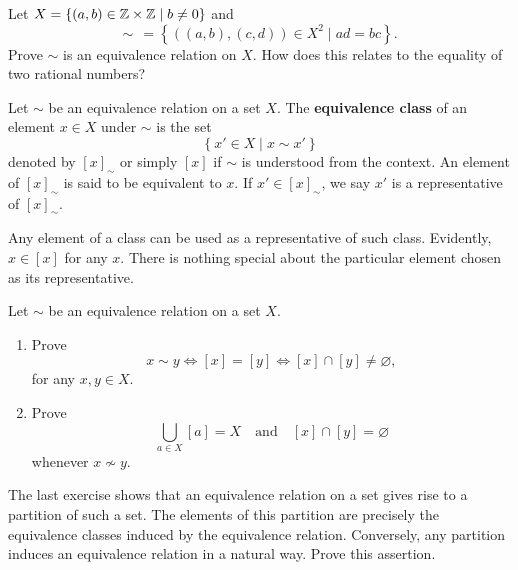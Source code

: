 \documentclass[11pt,a4paper]{article}
\begin{document}
\begin{eje}\label{ej:eqv.rel.on.z2.gives.q}
    Let \(X = \left\{ (a,b  )\in \mathbb{Z}\times \mathbb{Z}     \mid b\neq 0 \right\}\)
    and  \[\sim\;\, = \left\{ ((a,b), (c,d)) \in X^2 \mid ad=bc \right\}.\]
    Prove \(\sim\) is an equivalence relation on \(X\). How does this relates to the equality of two rational numbers?
\end{eje}

\begin{defi}
    Let \(\sim\) be an equivalence relation on a set \(X\).
    The \textbf{equivalence class} of an element \(x\in X\)   under \(\sim\) is the set 
    \[ \left\{ x' \in X \mid x\sim x' \right\}\]
    denoted by \([x]_\sim \) or simply \([x]\) if \(\sim\) is understood from the context.
    An element of \([x]_\sim\) is said to be equivalent to \(x\). 
    If \(x' \in [x]_\sim\), we say \(x'\) is a representative of \([x]_\sim\).
\end{defi}

Any  element of a class
can be used as a representative of such class.
Evidently, \(x\in [x]\) for any \(x\).
There is nothing special about the particular
element chosen as its representative.

\begin{eje}
    Let \(\sim\) be an equivalence relation on a set \(X\).
    \begin{enumerate}[label=(\roman*)]
        \item Prove \[x\sim y \iff [x] = [y] \iff [x]\cap [y] \neq \varnothing,\]
    for any \(x,y\in X\).
        
        \item Prove 
        \[\bigcup_{a\in X} [a] = X\quad \text{and} \quad [x]\cap [y] = \varnothing\]
        whenever \(x\nsim y \).
    \end{enumerate}
    
\end{eje}

The last exercise shows that an equivalence relation on a set  gives rise to a partition of such a set.
The elements of this partition are precisely the equivalence classes induced by the equivalence relation.
Conversely, any partition induces an equivalence relation in a natural way.
Prove this assertion.

 
\end{document}
